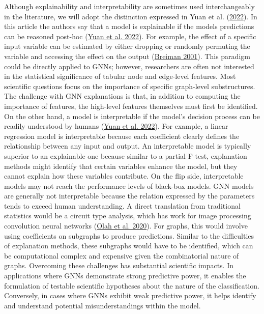 \documentclass[
  11pt,
  letterpaper,
]{article}
\begin{document}
\quad Although explainability and interpretability are sometimes used
interchangeably in the literature, we will adopt the distinction
expressed in Yuan et al.
(\protect\hyperlink{ref-Yuan_Yu_Gui_Ji_2022}{2022}). In this article the
authors say that a model is explainable if the models predictions can be
reasoned post-hoc (\protect\hyperlink{ref-Yuan_Yu_Gui_Ji_2022}{Yuan et
al. 2022}). For example, the effect of a specific input variable can be
estimated by either dropping or randomly permuting the variable and
accessing the effect on the output
(\protect\hyperlink{ref-Breiman_2001}{Breiman 2001}). This paradigm
could be directly applied to GNNs; however, researchers are often not
interested in the statistical significance of tabular node and
edge-level features. Most scientific questions focus on the importance
of specific graph-level substructures. The challenge with GNN
explanations is that, in addition to computing the importance of
features, the high-level features themselves must first be identified.
On the other hand, a model is interpretable if the model's decision
process can be readily understood by humans
(\protect\hyperlink{ref-Yuan_Yu_Gui_Ji_2022}{Yuan et al. 2022}). For
example, a linear regression model is interpretable because each
coefficient clearly defines the relationship between any input and
output. An interpretable model is typically superior to an explainable
one because similar to a partial F-test, explanation methods might
identify that certain variables enhance the model, but they cannot
explain how these variables contribute. On the flip side, interpretable
models may not reach the performance levels of black-box models. GNN
models are generally not interpretable because the relation expressed by
the parameters tends to exceed human understanding. A direct translation
from traditional statistics would be a circuit type analysis, which has
work for image processing convolution neural networks
(\protect\hyperlink{ref-olah2020zoom}{Olah et al. 2020}). For graphs,
this would involve using coefficients on subgraphs to produce
predictions. Similar to the difficulties of explanation methods, these
subgraphs would have to be identified, which can be computational
complex and expensive given the combinatorial nature of graphs.
Overcoming these challenges has substantial scientific impacts. In
applications where GNNs demonstrate strong predictive power, it enables
the formulation of testable scientific hypotheses about the nature of
the classification. Conversely, in cases where GNNs exhibit weak
predictive power, it helps identify and understand potential
misunderstandings within the model.
\end{document}
